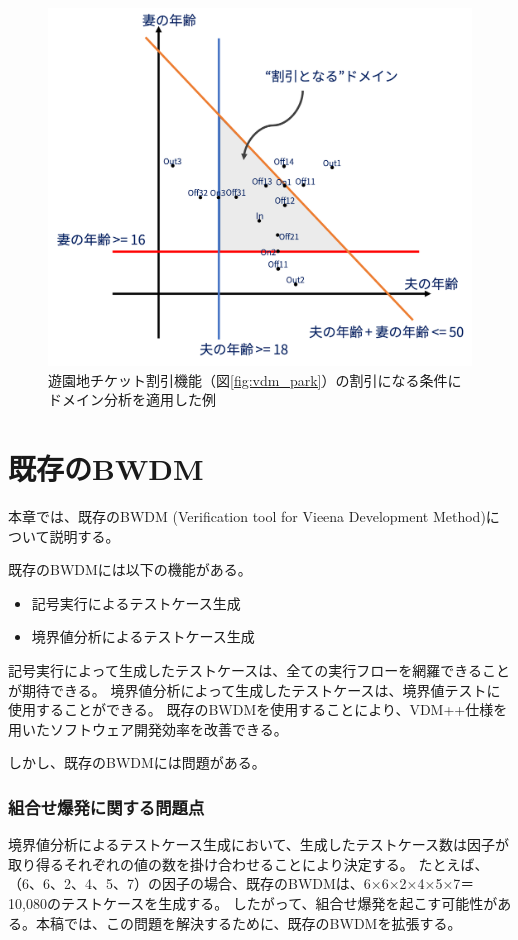 \documentclass[uplatex, report, a4j, 10pt]{jsbook}
\newcommand{\tool}{BWDM}
\newcommand{\toolFullName}{Verification tool for Vieena Development Method}
\begin{document}
\begin{figure}[tp]
  \centering
  \includegraphics[keepaspectratio, width=160mm]{figs/domain_points}
  \caption{遊園地チケット割引機能（図\ref{fig:vdm_park}）の割引になる条件にドメイン分析を適用した例}
  \label{fig:domain_points}
\end{figure}



\chapter{既存の\tool{}}\label{cha:Exist}

本章では、既存の\tool{} (\toolFullName{})について説明する。

既存のBWDMには以下の機能がある。

\begin{itemize}
  \item 記号実行によるテストケース生成
  \item 境界値分析によるテストケース生成
\end{itemize}

記号実行によって生成したテストケースは、全ての実行フローを網羅できることが期待できる。
境界値分析によって生成したテストケースは、境界値テストに使用することができる。
既存のBWDMを使用することにより、VDM++仕様を用いたソフトウェア開発効率を改善できる。

しかし、既存のBWDMには問題がある。

\subsection{組合せ爆発に関する問題点}
境界値分析によるテストケース生成において、生成したテストケース数は因子が取り得るそれぞれの値の数を掛け合わせることにより決定する。
たとえば、（6、6、2、4、5、7）の因子の場合、既存のBWDMは、6×6×2×4×5×7＝10,080のテストケースを生成する。
したがって、組合せ爆発を起こす可能性がある。本稿では、この問題を解決するために、既存のBWDMを拡張する。
\end{document}
